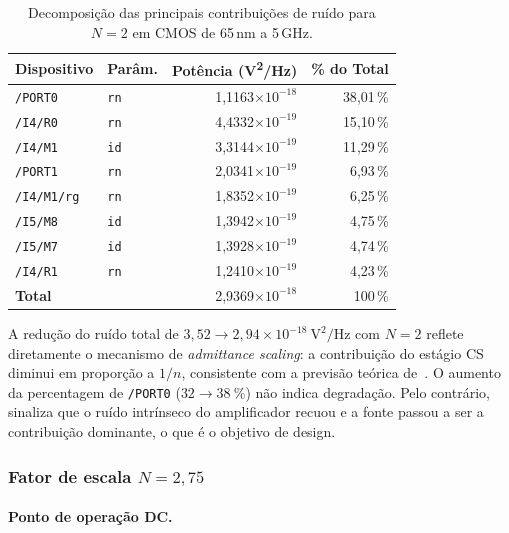 \begin{table}[H]
\centering
\caption{Decomposição das principais contribuições de ruído para $N=2$ em CMOS de 65\,nm a 5\,GHz.}
\label{tab:noise65_N2}
\begin{tabular}{llrr}
\hline
\textbf{Dispositivo} & \textbf{Parâm.} & \textbf{Potência (V\textsuperscript{2}/Hz)} & \textbf{\% do Total} \\
\hline
\texttt{/PORT0}    & \texttt{rn} & 1{,}1163$\times 10^{-18}$ & 38{,}01\,\% \\
\texttt{/I4/R0}    & \texttt{rn} & 4{,}4332$\times 10^{-19}$ & 15{,}10\,\% \\
\texttt{/I4/M1}    & \texttt{id} & 3{,}3144$\times 10^{-19}$ & 11{,}29\,\% \\
\texttt{/PORT1}    & \texttt{rn} & 2{,}0341$\times 10^{-19}$ & 6{,}93\,\%  \\
\texttt{/I4/M1/rg} & \texttt{rn} & 1{,}8352$\times 10^{-19}$ & 6{,}25\,\%  \\
\texttt{/I5/M8}    & \texttt{id} & 1{,}3942$\times 10^{-19}$ & 4{,}75\,\%  \\
\texttt{/I5/M7}    & \texttt{id} & 1{,}3928$\times 10^{-19}$ & 4{,}74\,\%  \\
\texttt{/I4/R1}    & \texttt{rn} & 1{,}2410$\times 10^{-19}$ & 4{,}23\,\%  \\
\hline
\textbf{Total}     &             & 2{,}9369$\times 10^{-18}$ & 100\,\%      \\
\hline
\end{tabular}
\end{table}

A redução do ruído total de $3{,}52 \to 2{,}94 \times 10^{-18}~\text{V}^2/\text{Hz}$ com $N=2$
reflete diretamente o mecanismo de \textit{admittance scaling}: a contribuição do estágio CS diminui
em proporção a $1/n$, consistente com a previsão teórica de~\cite{blaakmeer2008}. O aumento da
percentagem de \texttt{/PORT0} ($32 \to 38~\%$) não indica degradação. Pelo contrário, sinaliza
que o ruído intrínseco do amplificador recuou e a fonte passou a ser a contribuição dominante, o que
é o objetivo de design.

\subsubsection{Fator de escala \texorpdfstring{$N = 2{,}75$}{N=2.75}}

\paragraph{Ponto de operação DC.}

